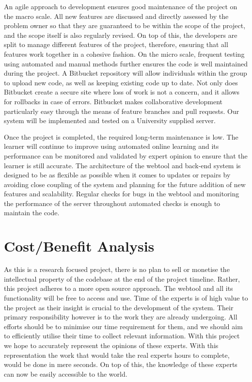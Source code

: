 \documentclass{ecmm427_assignment}
\begin{document}
 An agile approach to development ensures good maintenance of the project on the macro scale. All new features are discussed and directly assessed by the problem owner so that they are guaranteed to be within the scope of the project, and the scope itself is also regularly revised. On top of this, the developers are split to manage different features of the project, therefore, ensuring that all features work together in a cohesive fashion. On the micro scale, frequent testing using automated and manual methods further ensures the code is well maintained during the project. A Bitbucket repository will allow individuals within the group to upload new code, as well as keeping existing code up to date.  Not only does Bitbucket create a secure site where loss of work is not a concern, and it  allows for rollbacks in case of errors. Bitbucket makes collaborative development particularly easy through the means of feature branches and pull requests. Our system will be implemented and tested on a University supplied server.

 Once the project is completed, the required long-term maintenance is low. The learner will continue to improve using automated online learning and its performance can be monitored and validated by expert opinion to ensure that the learner is still accurate. The architecture of the webtool and back-end system is designed to be as flexible as possible when it comes to updates or repairs by avoiding close coupling of the system and planning for the future addition of new features and scalability. Regular checks for bugs in the webtool and monitoring the performance of the server throughout automated checks is enough to maintain the code.

\section{Cost/Benefit Analysis}

As this is a research focused project, there is no plan to sell or monetise the intellectual property of the codebase at the end of the project timeline. Rather, this project adheres to a more open source approach. The webtool and all its functionality will be free to access and use. Time of the experts is of high value to the project as their insight is crucial to the development of the system. Their primary responsibility however is to the work they are already undergoing. All efforts should be to minimise our time requirement for them, and we should aim to efficiently utilise their time to collect relevant information. With this project we hope to accurately represent the opinions of these experts. With this representation the work that would take the real experts hours to complete, would be done in mere seconds. On top of this, the knowledge of these experts can now be easily accessible to the world.
\end{document}
